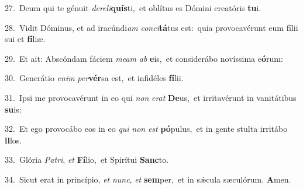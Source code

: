 {\numbfont\textcolor{\numbcolor}{27.}}~Deum qui te génuit \textit{de}\-\textit{re}\textit{li}\textbf{quís}ti,~\star et oblítus es Dómini creatóris \textbf{tu}\-i.\par
{\numbfont\textcolor{\numbcolor}{28.}}~Vidit Dóminus, et ad iracúndi\textit{am} \textit{con}\-\textit{ci}\textbf{tá}tus est:~\star quia provocavérunt eum fílii sui et \textbf{fí}\-liæ.\par
{\numbfont\textcolor{\numbcolor}{29.}}~Et ait: Abscóndam fáciem \textit{me}\-\textit{am} \textit{ab} \textbf{e}\-is,~\star et considerábo novíssima e\-\textbf{ó}\-rum:\par
{\numbfont\textcolor{\numbcolor}{30.}}~Generátio \textit{e}\-\textit{nim} \textit{per}\-\textbf{vér}sa est,~\star et infidéles \textbf{fí}\-lii.\par
{\numbfont\textcolor{\numbcolor}{31.}}~Ipsi me provocavérunt in eo qui \textit{non} \textit{e}\-\textit{rat} \textbf{De}\-us,~\star et irritavérunt in vanitátibus \textbf{su}\-is:\par
{\numbfont\textcolor{\numbcolor}{32.}}~Et ego provocábo eos in eo \textit{qui} \textit{non} \textit{est} \textbf{pó}\-pulus,~\star et in gente stulta irritábo \textbf{il}\-los.\par
{\numbfont\textcolor{\numbcolor}{33.}}~Glória \textit{Pa}\-\textit{tri}, \textit{et} \textbf{Fí}\-lio,~\star et Spirítui \textbf{Sanc}\-to.\par
{\numbfont\textcolor{\numbcolor}{34.}}~Sicut erat in princípio, \textit{et} \textit{nunc}\-, \textit{et} \textbf{sem}\-per,~\star et in sǽcula sæculórum. \textbf{A}\-men.\par
